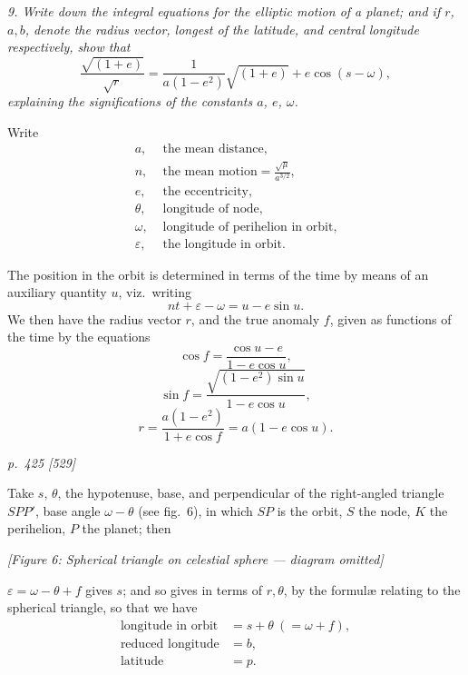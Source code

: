 \documentclass[11pt,a4paper]{book}
\begin{document}
\textit{9. Write down the integral equations for the elliptic motion of a planet; and if $r$, $a, b$, denote the radius vector, longest of the latitude, and central longitude respectively, show that}
\[
\frac{\sqrt{(1 + e)}}{\sqrt{r}} = \frac{1}{a(1 - e^2)} \sqrt{(1 + e)} + e\cos(s - \omega),
\]
\textit{explaining the significations of the constants $a$, $e$, $\omega$.}

Write
\begin{align*}
a, & \text{ the mean distance,}\\
n, & \text{ the mean motion} = \frac{\sqrt{\mu}}{a^{3/2}},\\
e, & \text{ the eccentricity,}\\
\theta, & \text{ longitude of node,}\\
\omega, & \text{ longitude of perihelion in orbit,}\\
\varepsilon, & \text{ the longitude in orbit.}
\end{align*}

The position in the orbit is determined in terms of the time by means of an
auxiliary quantity $u$, viz.\ writing
\[
nt + \varepsilon - \omega = u - e\sin u .
\]
We then have the radius vector $r$, and the true anomaly $f$, given as functions of the
time by the equations
\[
\cos f = \frac{\cos u - e}{1 - e\cos u},
\]
\[
\sin f = \frac{\sqrt{(1 - e^2)\sin u}}{1 - e\cos u},
\]
\[
r = \frac{a(1 - e^2)}{1 + e\cos f} = a(1 - e\cos u).
\]

\clearpage

\bigskip
\textit{p.~425 [529]}
\smallskip

Take $s$, $\theta$, the hypotenuse, base, and perpendicular of the right-angled triangle $SPP'$, base angle $\omega - \theta$ (see fig.~6), in which $SP$ is the orbit, $S$ the node, $K$ the perihelion, $P$ the planet; then

\begin{center}
\textit{[Figure 6: Spherical triangle on celestial sphere --- diagram omitted]}
\end{center}

\noindent
$\varepsilon = \omega - \theta + f$ gives $s$; and so gives in terms of $r, \theta$, by the formul\ae{} relating
to the spherical triangle, so that we have
\begin{align*}
\text{longitude in orbit} &= s + \theta\ (= \omega + f),\\
\text{reduced longitude} &= b,\\
\text{latitude} &= p.
\end{align*}
\end{document}
